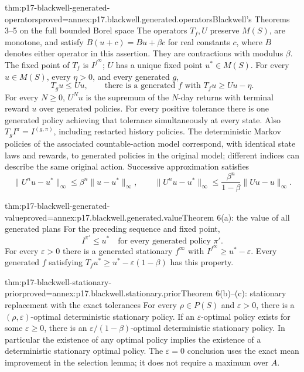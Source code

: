 \begin{hbtheorem}{thm:p17-blackwell-generated-operators}{proved=annex:p17.blackwell.generated.operators}{Blackwell's Theorems 3--5 on the full bounded Borel space}
The operators \(T_f,U\) preserve \(M(S)\), are monotone,
and satisfy \(B(u+c)=Bu+\beta c\) for real constants \(c\),
where \(B\) denotes either operator in this assertion.
They are contractions with modulus \(\beta\).
The fixed point of \(T_f\) is \(I^{f^\infty}\);
\(U\) has a unique fixed point \(u^*\in M(S)\).
For every \(u\in M(S)\), every \(\eta>0\), and every generated \(g\),
\[
 T_g u\leq Uu,\qquad
 \text{there is a generated }f\text{ with }T_fu\geq Uu-\eta .
\]
For every \(N\geq0\), \(U^Nu\) is the supremum of the
\(N\)-day returns with terminal reward \(u\) over generated policies.
For every positive tolerance there is one generated policy achieving
that tolerance simultaneously at every state.
Also \(T_gI^\pi=I^{(g,\pi)}\), including restarted history policies.
The deterministic Markov policies of the associated countable-action
model correspond, with identical state laws and rewards, to generated
policies in the original model; different indices can describe the
same original action.
Successive approximation satisfies
\[
 \|U^n u-u^*\|_\infty\leq\beta^n\|u-u^*\|_\infty,\qquad
 \|U^n u-u^*\|_\infty
       \leq\frac{\beta^n}{1-\beta}\|Uu-u\|_\infty .
\]
\end{hbtheorem}

\begin{hbtheorem}{thm:p17-blackwell-generated-value}{proved=annex:p17.blackwell.generated.value}{Theorem 6(a): the value of all generated plans}
For the preceding sequence and fixed point,
\[
 I^{\pi'}\leq u^*\quad\text{for every generated policy }\pi'.
\]
For every \(\varepsilon>0\) there is a generated stationary
\(f^\infty\) with \(I^{f^\infty}\geq u^*-\varepsilon\).
Every generated \(f\) satisfying
\(T_fu^*\geq u^*-\varepsilon(1-\beta)\) has this property.
\end{hbtheorem}

\begin{hbtheorem}{thm:p17-blackwell-stationary-prior}{proved=annex:p17.blackwell.stationary.prior}{Theorem 6(b)--(c): stationary replacement with the exact tolerances}
For every \(\rho\in P(S)\) and \(\varepsilon>0\), there is a
\((\rho,\varepsilon)\)-optimal deterministic stationary policy.
If an \(\varepsilon\)-optimal policy exists for some
\(\varepsilon\geq0\), there is an
\(\varepsilon/(1-\beta)\)-optimal deterministic stationary policy.
In particular the existence of any optimal policy implies the
existence of a deterministic stationary optimal policy.
The \(\varepsilon=0\) conclusion uses the exact mean improvement
in the selection lemma; it does not require a maximum over \(A\).
\end{hbtheorem}


